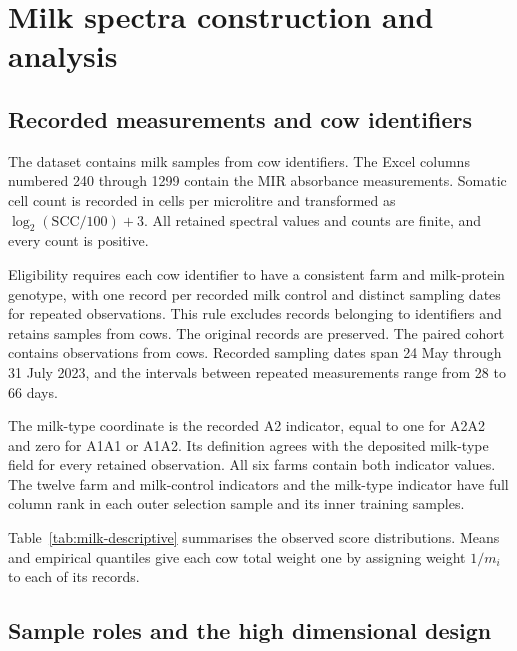 \section{Milk spectra construction and analysis}\label{supp:milk}


\subsection{Recorded measurements and cow identifiers}

The dataset \cite{chirife2025data} contains \MilkOriginalSamples{}
milk samples from \MilkOriginalCows{} cow identifiers. The Excel
columns numbered 240 through 1299 contain the \MilkSpectra{} MIR
absorbance measurements. Somatic cell count is recorded in cells
per microlitre and transformed as $\log_2(\mathrm{SCC}/100)+3$.
All retained spectral values and counts are finite, and every count
is positive.

Eligibility requires each cow identifier to have a consistent farm
and milk-protein genotype, with one record per recorded milk control
and distinct sampling dates for repeated observations. This rule
excludes \MilkInvalidSamples{} records belonging to
\MilkInvalidCows{} identifiers and retains \MilkSamples{} samples
from \MilkCows{} cows. The original records are preserved. The
paired cohort contains \MilkRepeatSamples{} observations from
\MilkRepeatCows{} cows. Recorded sampling dates span 24 May through
31 July 2023, and the intervals between repeated measurements range
from 28 to 66 days.

The milk-type coordinate is the recorded A2 indicator, equal to one
for A2A2 and zero for A1A1 or A1A2. Its definition agrees with the
deposited milk-type field for every retained observation. All six
farms contain both indicator values. The twelve farm and milk-control
indicators and the milk-type indicator have full column rank in
each outer selection sample and its inner training samples.

Table~\ref{tab:milk-descriptive} summarises the observed score
distributions. Means and empirical quantiles give each cow total
weight one by assigning weight $1/m_i$ to each of its records.



\subsection{Sample roles and the high dimensional design}

